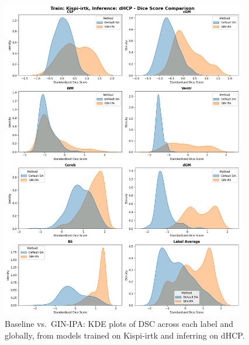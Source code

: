 \begin{figure}[htbp]
  \centering
  \includegraphics[width=0.95\textwidth]{figures/1_irtk-dhcp_DC.png}
  \caption{Baseline vs.\ GIN-IPA: KDE plots of DSC across each label and globally, from models trained on Kispi-irtk and inferring on dHCP.}
  \label{fig:1_irtk_dhcp_DC}
\end{figure}

